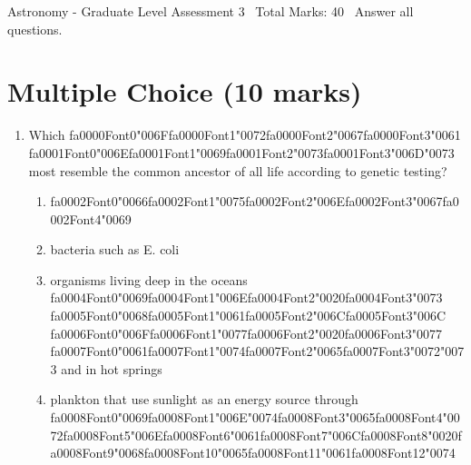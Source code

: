 \documentclass[12pt]{article}
\begin{document}
\begin{center}
Astronomy - Graduate Level Assessment 3 \
Total Marks: 40 \
Answer all questions.
\end{center}

\section*{Multiple Choice (10 marks)}
\begin{enumerate}[label=\arabic*.]
\item Which {\csname fa0000Font0\endcsname\char"006F}{\csname fa0000Font1\endcsname\char"0072}{\csname fa0000Font2\endcsname\char"0067}{\csname fa0000Font3\endcsname\char"0061} {\csname fa0001Font0\endcsname\char"006E}{\csname fa0001Font1\endcsname\char"0069}{\csname fa0001Font2\endcsname\char"0073}{\csname fa0001Font3\endcsname\char"006D}{\char"0073} most resemble the common ancestor of all life according to genetic
testing?
\begin{enumerate}[label=(\alph*)]
    \item {\csname fa0002Font0\endcsname\char"0066}{\csname fa0002Font1\endcsname\char"0075}{\csname fa0002Font2\endcsname\char"006E}{\csname fa0002Font3\endcsname\char"0067}{\csname fa0002Font4\endcsname\char"0069}
    \item bacteria such as E. coli
    \item organisms living deep in the oceans {\csname fa0004Font0\endcsname\char"0069}{\csname fa0004Font1\endcsname\char"006E}{\csname fa0004Font2\endcsname\char"0020}{\csname fa0004Font3\endcsname\char"0073} {\csname fa0005Font0\endcsname\char"0068}{\csname fa0005Font1\endcsname\char"0061}{\csname fa0005Font2\endcsname\char"006C}{\csname fa0005Font3\endcsname\char"006C} {\csname fa0006Font0\endcsname\char"006F}{\csname fa0006Font1\endcsname\char"0077}{\csname fa0006Font2\endcsname\char"0020}{\csname fa0006Font3\endcsname\char"0077} {\csname fa0007Font0\endcsname\char"0061}{\csname fa0007Font1\endcsname\char"0074}{\csname fa0007Font2\endcsname\char"0065}{\csname fa0007Font3\endcsname\char"0072}{\char"0073} and in hot springs
    \item plankton that use sunlight as an energy source through {\csname fa0008Font0\endcsname\char"0069}{\csname fa0008Font1\endcsname\char"006E}{\char"0074}{\csname fa0008Font3\endcsname\char"0065}{\csname fa0008Font4\endcsname\char"0072}{\csname fa0008Font5\endcsname\char"006E}{\csname fa0008Font6\endcsname\char"0061}{\csname fa0008Font7\endcsname\char"006C}{\csname fa0008Font8\endcsname\char"0020}{\csname fa0008Font9\endcsname\char"0068}{\csname fa0008Font10\endcsname\char"0065}{\csname fa0008Font11\endcsname\char"0061}{\csname fa0008Font12\endcsname\char"0074}

\end{enumerate}
\end{enumerate}
\end{document}

